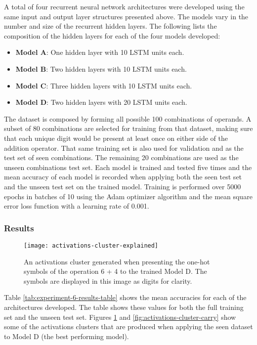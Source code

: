 A total of four recurrent neural network architectures were developed using the same input and output layer structures presented above. The models vary in the number and size of the recurrent hidden layers.  The following lists the composition of the hidden layers for each of the four models developed:
\begin{itemize}
	\item \textbf{Model A}: One hidden layer with 10 LSTM units each.
	\item \textbf{Model B}: Two hidden layers with 10 LSTM units each.
	\item \textbf{Model C}: Three hidden layers with 10 LSTM units each.
	\item \textbf{Model D}: Two hidden layers with 20 LSTM units each.
\end{itemize}

The dataset is composed by forming all possible 100 combinations of operands. A subset of 80 combinations are selected for training from that dataset, making sure that each unique digit would be present at least once on either side of the addition operator. That same training set is also used for validation and as the test set of seen combinations. The remaining 20 combinations are used as the unseen combinations test set. Each model is trained and tested five times and the mean accuracy of each model is recorded when applying both the seen test set and the unseen test set on the trained model. Training is performed over 5000 epochs in batches of 10 using the Adam optimizer algorithm and the mean square error loss function with a learning rate of 0.001.

\subsubsection{Results}

\begin{figure}
	\centering
	\texttt{[image: activations-cluster-explained]}
	\caption{An activations cluster generated when presenting the one-hot symbols of the operation 6 + 4 to the trained Model D. The symbols are displayed in this image as digits for clarity.}
	\label{fig:activations-cluster-explained}
\end{figure}

Table \ref{tab:experiment-6-results-table} shows the mean accuracies for each of the architectures developed. The table shows these values for both the full training set and the unseen test set. Figures \ref{fig:activations-cluster-explained} and \ref{fig:activations-cluster-carry} show some of the activations clusters that are produced when applying the seen dataset to Model D (the best performing model).

